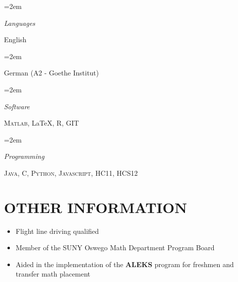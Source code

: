 \documentclass[paper=a4,fontsize=11pt]{scrartcl} %
\newlength{\spacebox}
\newcommand{\NewPart}[1]{\section*{\uppercase{#1}}}
\newcommand{\PersonalEntry}[2]{
		\noindent\hangindent=2em\hangafter=0 %
		\parbox{\spacebox}{        %
		\textit{#1}}		       %
		\hspace{1.5em} #2 \par}    %
\newcommand{\SkillsEntry}[2]{      %
		\noindent\hangindent=2em\hangafter=0 %
		\parbox{\spacebox}{        %
		\textit{#1}}			   %
		\hspace{1.5em} #2 \par}    %
\begin{document}
\SkillsEntry{Languages}{English}
\SkillsEntry{}{German (A2 - Goethe Institut)}

\SkillsEntry{Software}{\textsc{Matlab}, \LaTeX, \textsc{R}, \textsc{GIT}}
\SkillsEntry{Programming}{\textsc{Java}, \textsc{C}, \textsc{Python}, \textsc{Javascript}, \textsc{HC11}, \textsc{HCS12}}


\NewPart{\normalsize Other Information}{}
\begin{itemize}
\setlength\itemsep{-.15cm}
\item[] Flight line driving qualified
\item[] Member of the SUNY Oswego Math Department Program Board
\item[] \hspace*{1cm} Aided in the implementation of the \textbf{ALEKS} program for freshmen and\\ \hspace*{1.05cm} transfer math placement
\end{itemize}
\end{document}
